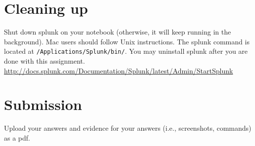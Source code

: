 \documentclass[a4paper, 10pt]{article}
\begin{document}
\section*{Cleaning up}

Shut down splunk on your notebook (otherwise, it will keep running in the background).
Mac users should follow Unix instructions.
The splunk command is located at \texttt{/Applications/Splunk/bin/}.
You may uninstall splunk after you are done with this assignment. \\
\href{http://docs.splunk.com/Documentation/Splunk/latest/Admin/StartSplunk}{http://docs.splunk.com/Documentation/Splunk/latest/Admin/StartSplunk}

\section*{Submission}

Upload your answers and evidence for your answers (i.e., screenshots, commands) as a pdf.
\end{document}
